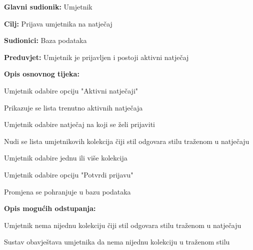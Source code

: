 					\noindent {}
					\begin{packed_item}
						
						\item \textbf{Glavni sudionik: }Umjetnik
						\item  \textbf{Cilj: }Prijava umjetnika na natječaj
						\item  \textbf{Sudionici: }Baza podataka
						\item  \textbf{Preduvjet:} Umjetnik je prijavljen i postoji aktivni natječaj
						\item  \textbf{Opis osnovnog tijeka:}
						
						\item[] \begin{packed_enum}
							
							\item Umjetnik odabire opciju "Aktivni natječaji"
							\item Prikazuje se lista trenutno
							aktivnih natječaja
							\item Umjetnik odabire natječaj na koji se želi prijaviti
							\item Nudi se lista umjetnikovih kolekcija čiji stil odgovara stilu traženom u natječaju
							\item Umjetnik odabire jednu ili više kolekcija
							\item Umjetnik odabire opciju "Potvrdi prijavu"
							\item Promjena se pohranjuje u bazu podataka
							
						\end{packed_enum}
						
						\item  \textbf{Opis mogućih odstupanja:}
						
						\item[] \begin{packed_item}
							
							\item[4.a] Umjetnik nema nijednu kolekciju čiji stil odgovara stilu traženom u natječaju
							\item[] \begin{packed_enum}
								\item Sustav obavještava umjetnika da nema nijednu kolekciju u traženom stilu
							\end{packed_enum}
							
						\end{packed_item}
					\end{packed_item}
				\eject
					

